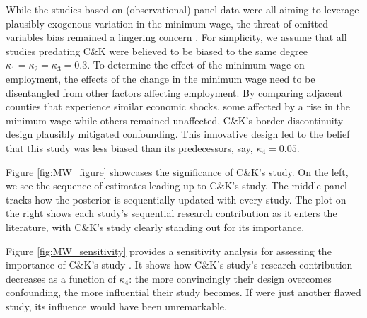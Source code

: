 While the studies based on (observational) panel data were all aiming to leverage plausibly exogenous variation in the minimum wage, the threat of omitted variables bias remained a lingering concern \citep{nobel_21}.
For simplicity, we assume that all studies predating C\&K were believed to be biased to the same degree $\kappa_{1} = \kappa_{2} = \kappa_{3} = 0.3$. To determine the effect of the minimum wage on employment, the effects of the change in the minimum wage need to be disentangled from other factors affecting employment. 
By comparing adjacent counties that experience similar economic shocks, some affected by a rise in the minimum wage while others remained unaffected, C\&K's border discontinuity design 
plausibly mitigated confounding. This innovative design led to the belief that this study was less biased than its predecessors, say, $\kappa_4= 0.05$.

Figure \ref{fig:MW_figure} showcases the significance of C\&K's study. 
On the left, we see the sequence of estimates leading up to C\&K's study. The middle panel tracks how the posterior is sequentially updated with every study. The plot on the right shows each study's sequential research contribution as it enters the literature, with C\&K's study clearly standing out for its importance.

Figure \ref{fig:MW_sensitivity} provides a sensitivity analysis for assessing the importance of C\&K's study
\citep{Card_Krueger_94}. It shows how C\&K's study's research contribution decreases as a function of $\kappa_{4}$: the more convincingly their design overcomes confounding, the more influential their study becomes. If \citep{Card_Krueger_94} were just another flawed study, its influence would have been unremarkable.





